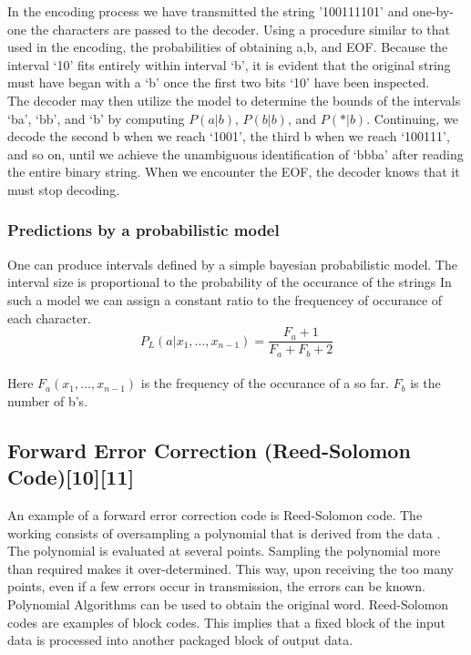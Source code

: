 \documentclass[10pt,twocolumn,letterpaper]{article}
\begin{document}
In the encoding process we have transmitted the string '100111101' and one-by-one the characters are passed to the decoder. 
Using a procedure similar to that used in the encoding, the probabilities of obtaining a,b, and EOF. 
Because the interval ‘10' fits entirely within interval ‘b', it is evident that the original string must have began with a ‘b' once the first two bits ‘10' have been inspected.
\\
The decoder may then utilize the model to determine the bounds of the intervals ‘ba', ‘bb', and ‘b' by computing $P(a \vert b)$, $P(b \vert b)$, and $P(* \vert b)$. Continuing, we decode the second b when we reach ‘1001', the third b when we reach ‘100111', and so on, until we achieve the unambiguous identification of ‘bbba' after reading the entire binary string.
When we encounter the EOF, the decoder knows that it must stop decoding. 


\subsubsection{Predictions by a probabilistic model}
One can produce intervals defined by a simple bayesian probabilistic model. The interval size is proportional to the probability of the occurance of the strings
In such a model we can assign a constant ratio to the frequencey of occurance of each character. 
\begin{equation} 
    P_L(a \vert x_1, . . . , x_{n-1}) = \frac{F_a + 1}{F_a + F_b + 2}
\end{equation}
\\
Here $F_a(x_1, \dots, x_{n-1})$ is the frequency of the occurance of a so far. $F_b$ is the number of b's.\\

\subsection{Forward Error Correction (Reed-Solomon Code){\small[10][11]}}
An example of a forward error correction code is Reed-Solomon code. The working consists of oversampling a polynomial that is derived from the data
. The polynomial is evaluated at several points. Sampling the polynomial more than required makes it over-determined. This way, upon receiving the too many points, even if a few errors occur in transmission, the errors can be known. Polynomial Algorithms can be used to obtain the original word.
Reed-Solomon codes are examples of block codes. This implies that a fixed block of the input data is processed into another packaged block of output data. 
\end{document}
